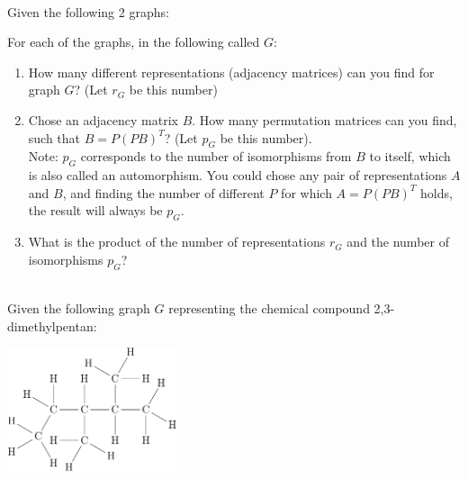 \documentclass[10pt]{article}
\begin{document}
\\
Given the following 2 graphs:

 \hspace{3cm}

For each of the graphs, in the following called $G$:
\begin{enumerate}
\item How many different representations (adjacency matrices) can you find for graph $G$? (Let $r_G$ be this number)
\item Chose an adjacency matrix $B$. How many permutation matrices can you find, such that $B=P(PB)^T$? (Let $p_G$  be this number).\\[0.2cm]

  Note: $p_G$ corresponds to the number of isomorphisms from $B$ to itself, which is also called an automorphism. You could chose any pair of representations $A$ and $B$, and finding the number of different $P$ for which $A=P(PB)^T$ holds, the result will always be $p_G$.\\[0.2cm]
\item What is the product of the number of representations $r_G$ and the number of isomorphisms $p_G$? 
\end{enumerate}


\\
Given the following graph $G$ representing the chemical compound 2,3-dimethylpentan:

\includegraphics[width=5cm]{23dimethylpentan.pdf}
\end{document}
